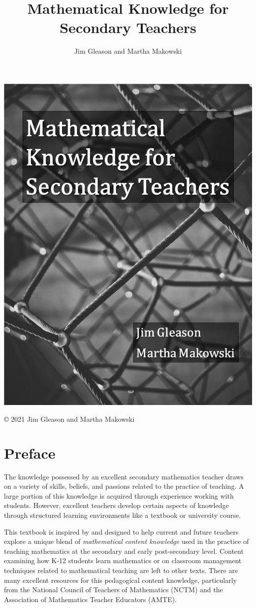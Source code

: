 \documentclass[
]{book}
\title{Mathematical Knowledge for Secondary Teachers}
\author{Jim Gleason and Martha Makowski}
\date{}
\theoremstyle{definition}
\theoremstyle{definition}
\theoremstyle{definition}
\theoremstyle{remark}
\begin{document}
\maketitle

{
\setcounter{tocdepth}{1}
\tableofcontents
}
\hypertarget{section}{%
\chapter*{}\label{section}}

\begin{center}\includegraphics[width=0.5\linewidth]{images/Cover} \end{center}

© 2021 Jim Gleason and Martha Makowski

\hypertarget{preface}{%
\chapter*{Preface}\label{preface}}

The knowledge possessed by an excellent secondary mathematics teacher draws on a variety of skills, beliefs, and passions related to the practice of teaching. A large portion of this knowledge is acquired through experience working with students. However, excellent teachers develop certain aspects of knowledge through structured learning environments like a textbook or university course.

This textbook is inspired by \citet{Usiskin2003} and designed to help current and future teachers explore a unique blend of \emph{mathematical content knowledge} used in the practice of teaching mathematics at the secondary and early post-secondary level. Content examining how K-12 students learn mathematics or on classroom management techniques related to mathematical teaching are left to other texts. There are many excellent resources for this pedagogical content knowledge, particularly from the National Council of Teachers of Mathematics (NCTM) and the Association of Mathematics Teacher Educators (AMTE).
\end{document}
